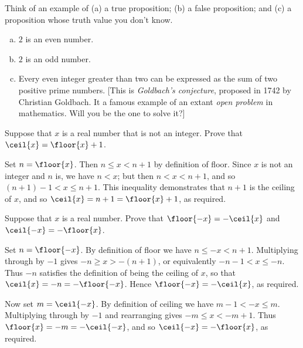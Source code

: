 
\begin{exercise}
\label{exExamplesOfPropositions}
Think of an example of (a) a true proposition; (b) a false proposition; and (c) a proposition whose truth value you don't know.
\end{exercise}

\begin{solutions*}
  \fixlistskip
  \begin{enumerate}[(a)]
  \item $2$ is an even number.
  \item $2$ is an odd number.
  \item Every even integer greater than two can be expressed as the sum of two positive prime numbers. [This is \textit{Goldbach's conjecture}, proposed in 1742 by Christian Goldbach. It a famous example of an extant \textit{open problem} in mathematics. Will you be the one to solve it?]
  \end{enumerate}
\end{solutions*}


\begin{exercise}
\label{exFloorCeilingOfNonInteger}
Suppose that $x$ is a real number that is not an integer. Prove that $\ceil{x} = \floor{x} + 1$.
\end{exercise}

\begin{solutions*}
Set $n = \floor{x}$. Then $n \le x < n+1$ by definition of floor. Since $x$ is not an integer and $n$ is, we have $n < x$; but then $n<x<n+1$, and so $(n+1)-1 < x \le n+1$. This inequality demonstrates that $n+1$ is the ceiling of $x$, and so $\ceil{x} = n+1 = \floor{x} + 1$, as required.
\end{solutions*}

\begin{exercise}
Suppose that $x$ is a real number. Prove that $\floor{-x} = -\ceil{x}$ and $\ceil{-x} = -\floor{x}$.
\end{exercise}

\begin{solutions*}
Set $n = \floor{-x}$. By definition of floor we have $n \le -x < n+1$. Multiplying through by $-1$ gives $-n \ge x > -(n+1)$, or equivalently $-n-1 < x \le -n$. Thus $-n$ satisfies the definition of being the ceiling of $x$, so that $\ceil{x} = -n = -\floor{-x}$. Hence $\floor{-x} = -\ceil{x}$, as required.

Now set $m = \ceil{-x}$. By definition of ceiling we have $m-1 < -x \le m$. Multiplying through by $-1$ and rearranging gives $-m \le x < -m+1$. Thus $\floor{x} = -m = -\ceil{-x}$, and so $\ceil{-x} = -\floor{x}$, as required.
\end{solutions*}

